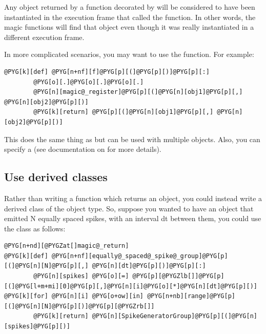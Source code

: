 \documentclass[letterpaper,10pt,english]{manual}
\begin{document}
Any object returned by a function decorated by \hyperlink{brian.magic_return}{} will be
considered to have been instantiated in the execution frame that called the
function. In other words, the magic functions will find that object even
though it was really instantiated in a different execution frame.

In more complicated scenarios, you may want to use the \hyperlink{brian.magic_register}{}
function. For example:

\begin{Verbatim}[commandchars=@\[\]]
@PYG[k][def] @PYG[n+nf][f]@PYG[p][(]@PYG[p][)]@PYG[p][:]
        @PYG[o][.]@PYG[o][.]@PYG[o][.]
        @PYG[n][magic@_register]@PYG[p][(]@PYG[n][obj1]@PYG[p][,] @PYG[n][obj2]@PYG[p][)]
        @PYG[k][return] @PYG[p][(]@PYG[n][obj1]@PYG[p][,] @PYG[n][obj2]@PYG[p][)]
\end{Verbatim}

This does the same thing as \hyperlink{brian.magic_return}{} but can be used with
multiple objects. Also, you can specify a  (see documentation on
\hyperlink{brian.magic_register}{} for more details).

\subsection{Use derived classes}

Rather than writing a function which returns an object, you could instead
write a derived class of the object type. So, suppose you wanted to have an
object that emitted N equally spaced spikes, with an interval dt between
them, you could use the \hyperlink{brian.SpikeGeneratorGroup}{} class as follows:

\begin{Verbatim}[commandchars=@\[\]]
@PYG[n+nd][@PYGZat[]magic@_return]
@PYG[k][def] @PYG[n+nf][equally@_spaced@_spike@_group]@PYG[p][(]@PYG[n][N]@PYG[p][,] @PYG[n][dt]@PYG[p][)]@PYG[p][:]
        @PYG[n][spikes] @PYG[o][=] @PYG[p][@PYGZlb[]]@PYG[p][(]@PYG[l+m+mi][0]@PYG[p][,]@PYG[n][i]@PYG[o][*]@PYG[n][dt]@PYG[p][)] @PYG[k][for] @PYG[n][i] @PYG[o+ow][in] @PYG[n+nb][range]@PYG[p][(]@PYG[n][N]@PYG[p][)]@PYG[p][@PYGZrb[]]
        @PYG[k][return] @PYG[n][SpikeGeneratorGroup]@PYG[p][(]@PYG[n][spikes]@PYG[p][)]
\end{Verbatim}
\end{document}
